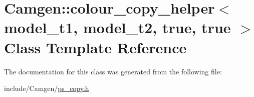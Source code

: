 \hypertarget{a00077}{\section{Camgen\-:\-:colour\-\_\-copy\-\_\-helper$<$ model\-\_\-t1, model\-\_\-t2, true, true $>$ Class Template Reference}
\label{a00077}
}


The documentation for this class was generated from the following file\-:\begin{DoxyCompactItemize}
\item 
include/\-Camgen/\hyperlink{a00712}{ps\-\_\-copy.\-h}\end{DoxyCompactItemize}
